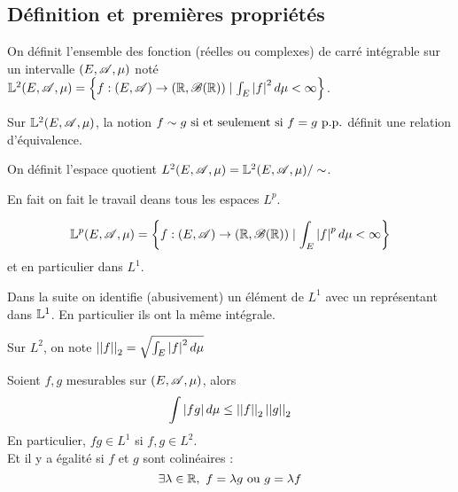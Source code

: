 \subsection{Définition et premières propriétés}

\begin{definition}
	On définit l'ensemble des fonction (réelles ou complexes) de carré intégrable sur un intervalle $(E, \mathscr{A}, \mu)$ noté
	$\mathbb{L}^2 (E, \mathscr{A}, \mu) = \left\{ f: (E, \mathscr{A}) \to (\mathbb{R}, \mathscr{B}(\mathbb{R})) \mid \int_E \left|f\right|^2 d \mu < \infty \right\}$.
\end{definition}


\begin{prop}
	Sur $\mathbb{L}^2 (E, \mathscr{A}, \mu)$, la notion $f \sim g \text{ si et seulement si } f = g \text{ p.p.}$ définit une relation d'équivalence.
\end{prop}

\begin{definition}
	On définit l'espace quotient $L^2(E, \mathscr{A}, \mu) = \mathbb{L}^2 (E, \mathscr{A}, \mu) / \sim$.
\end{definition}

\begin{remarque}
	En fait on fait le travail deans tous les espaces $L^p$.

	$$ \mathbb{L}^p (E, \mathscr{A}, \mu) = \left\{ f: (E, \mathscr{A}) \to (\mathbb{R}, \mathscr{B}(\mathbb{R})) \mid \int_E \left|f\right|^p d \mu < \infty \right\}$$
	et en particulier dans $L^1$.
\end{remarque}

\begin{remarque}
	Dans la suite on identifie (abusivement) un élément de $L^1$ avec un représentant dans $\mathbb{L}^1$.
	En particulier ils ont la même intégrale.

	Sur $L^2$, on note $\left|\left|f\right|\right|_2 = \sqrt{\int_E \left|f\right|^2 d \mu}$
\end{remarque}


\begin{theorem}
	Soient $f, g$ mesurables sur $(E, \mathscr{A}, \mu)$, alors
	$$\int \left|fg\right| d \mu \leq \left|\left|f\right|\right|_2 \left|\left|g\right|\right|_2$$
	En particulier, $fg \in L^1$ si $f, g \in L^2$.\\
	Et il y a égalité si  $f$ et $g$ sont colinéaires :
	$$\exists \lambda \in \mathbb{R}, \ f = \lambda g \text{ ou } g = \lambda f$$
\end{theorem}

